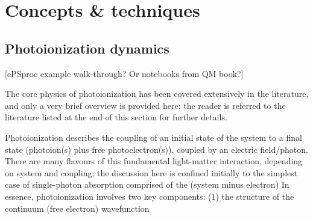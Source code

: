 \section{Concepts \& techniques}

\subsection{Photoionization dynamics} 
[ePSproc example walk-through? Or notebooks from QM book?]

The core physics of photoionization has been covered extensively in the literature, and only a very brief overview is provided here; the reader is referred to the literature listed at the end of this section for further details.

Photoionization describes the coupling of an initial state of the system to a final state (photoion(s) plus free photoelectron(s)), coupled by an electric field/photon. There are many flavours of this fundamental light-matter interaction, depending on system and coupling; the discussion here is confined initially to the simplest case of single-photon absorption
comprised of the (system minus electron)  In essence, photoionization involves two key components: (1) the structure of the continuum (free electron) wavefunction 